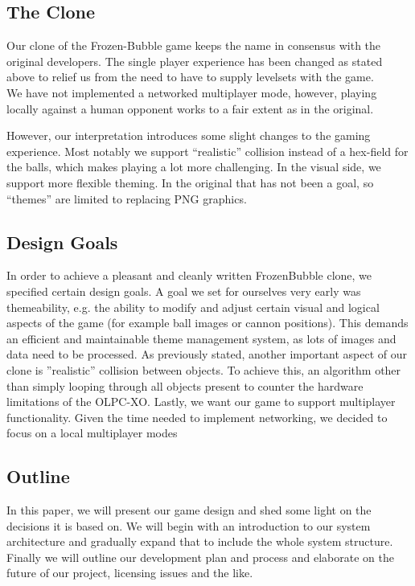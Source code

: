 \subsection{The Clone}
Our clone of the Frozen-Bubble game keeps the name in consensus with the original developers.
The single player experience has been changed as stated above to relief us from the need 
to have to supply levelsets with the game.\\
We have not implemented a networked multiplayer mode, however, playing locally against 
a human opponent works to a fair extent as in the original.

However, our interpretation introduces some slight changes to the gaming experience.
Most notably we support ``realistic'' collision instead of a hex-field for the balls, which
makes playing a lot more challenging. In the visual side, we support more flexible theming.
In the original that has not been a goal, so ``themes'' are limited to replacing 
PNG graphics.
%
\subsection{Design Goals}
In order to achieve a pleasant and cleanly written FrozenBubble clone, we specified certain design goals.
A goal we set for ourselves very early was themeability, e.g. the ability to modify and adjust certain visual and logical aspects of the game (for example ball images or cannon positions). This demands an efficient and maintainable theme management system, as lots of images and data need to be processed.
As previously stated, another important aspect of our clone is ''realistic'' collision between objects. To achieve this, an algorithm other than simply looping through all objects present to counter the hardware limitations of the OLPC-XO.
Lastly, we want our game to support multiplayer functionality. Given the time needed to implement networking, we decided to focus on a local multiplayer modes 

%
\subsection{Outline}
In this paper, we will present our game design and shed some light on the decisions 
it is based on. We will begin with an introduction to our system architecture and 
gradually expand that to include the whole system structure.\\
Finally we will outline our development plan and process and elaborate on the 
future of our project, licensing issues and the like.
%
